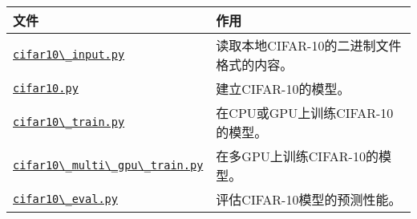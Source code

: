 

\begin{longtable}[c]{@{}ll@{}}
\toprule
\begin{minipage}[b]{0.05\columnwidth}\raggedright\strut
文件
\strut\end{minipage} &
\begin{minipage}[b]{0.05\columnwidth}\raggedright\strut
作用
\strut\end{minipage}\tabularnewline
\midrule
\endhead
\begin{minipage}[t]{0.05\columnwidth}\raggedright\strut
\href{https://tensorflow.googlesource.com/tensorflow/+/master/tensorflow/models/image/cifar10/cifar10_input.py}{\lstinline{cifar10\_input.py}}
\strut\end{minipage} &
\begin{minipage}[t]{0.05\columnwidth}\raggedright\strut
读取本地CIFAR-10的二进制文件格式的内容。
\strut\end{minipage}\tabularnewline
\begin{minipage}[t]{0.05\columnwidth}\raggedright\strut
\href{https://tensorflow.googlesource.com/tensorflow/+/master/tensorflow/models/image/cifar10/cifar10.py}{\lstinline{cifar10.py}}
\strut\end{minipage} &
\begin{minipage}[t]{0.05\columnwidth}\raggedright\strut
建立CIFAR-10的模型。
\strut\end{minipage}\tabularnewline
\begin{minipage}[t]{0.05\columnwidth}\raggedright\strut
\href{https://tensorflow.googlesource.com/tensorflow/+/master/tensorflow/models/image/cifar10/cifar10_train.py}{\lstinline{cifar10\_train.py}}
\strut\end{minipage} &
\begin{minipage}[t]{0.05\columnwidth}\raggedright\strut
在CPU或GPU上训练CIFAR-10的模型。
\strut\end{minipage}\tabularnewline
\begin{minipage}[t]{0.05\columnwidth}\raggedright\strut
\href{https://tensorflow.googlesource.com/tensorflow/+/master/tensorflow/models/image/cifar10/cifar10_multi_gpu_train.py}{\lstinline{cifar10\_multi\_gpu\_train.py}}
\strut\end{minipage} &
\begin{minipage}[t]{0.05\columnwidth}\raggedright\strut
在多GPU上训练CIFAR-10的模型。
\strut\end{minipage}\tabularnewline
\begin{minipage}[t]{0.05\columnwidth}\raggedright\strut
\href{https://tensorflow.googlesource.com/tensorflow/+/master/tensorflow/models/image/cifar10/cifar10_eval.py}{\lstinline{cifar10\_eval.py}}
\strut\end{minipage} &
\begin{minipage}[t]{0.05\columnwidth}\raggedright\strut
评估CIFAR-10模型的预测性能。
\strut\end{minipage}\tabularnewline
\bottomrule
\end{longtable}

